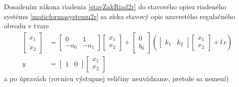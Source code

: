 \documentclass[a4paper, 10pt, ]{article}
\begin{document}
Dosadením zákona riadenia \eqref{stavZakRiad2r} do stavového opisu riadeného systému \eqref{maticformasystemu2r} sa získa stavový opis uzavretého regulačného obvodu v tvare
\begin{subequations} \label{stavopisURO2r}
    \begin{align}
        \begin{bmatrix} \dot x_1  \\ \dot x_2 \end{bmatrix}
        & =
        \begin{bmatrix} 0 & 1 \\ -a_0 & -a_1 \end{bmatrix}
        \begin{bmatrix} x_1 \\ x_2 \end{bmatrix}
        +
        \begin{bmatrix} 0 \\ b_0 \end{bmatrix}
        \left(
            \begin{bmatrix} k_1 & k_2 \end{bmatrix}
            \begin{bmatrix} x_1 \\ x_2 \end{bmatrix}
            + l \, r
        \right) \\
        y &=
         \begin{bmatrix} 1 & 0 \end{bmatrix}
         \begin{bmatrix} x_1 \\ x_2 \end{bmatrix}
    \end{align}
\end{subequations}
a po úpravách (rovnicu výstupnej veličiny neuvádzame, pretože sa nemení)
\end{document}
